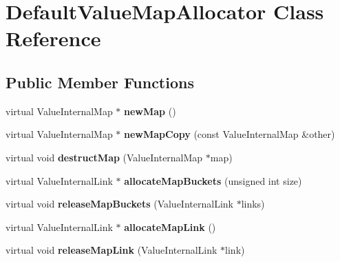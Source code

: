 \hypertarget{class_default_value_map_allocator}{\section{Default\-Value\-Map\-Allocator Class Reference}
\label{class_default_value_map_allocator}
}
\subsection*{Public Member Functions}
\begin{DoxyCompactItemize}
\item 
\hypertarget{class_default_value_map_allocator_af58f1000da938b453f499270642db381}{virtual Value\-Internal\-Map $\ast$ {\bfseries new\-Map} ()}\label{class_default_value_map_allocator_af58f1000da938b453f499270642db381}

\item 
\hypertarget{class_default_value_map_allocator_a4edf94de1fe95c7722421694c3ac101f}{virtual Value\-Internal\-Map $\ast$ {\bfseries new\-Map\-Copy} (const Value\-Internal\-Map \&other)}\label{class_default_value_map_allocator_a4edf94de1fe95c7722421694c3ac101f}

\item 
\hypertarget{class_default_value_map_allocator_aa37cddbdf061065dbe6cb12e9de5ac08}{virtual void {\bfseries destruct\-Map} (Value\-Internal\-Map $\ast$map)}\label{class_default_value_map_allocator_aa37cddbdf061065dbe6cb12e9de5ac08}

\item 
\hypertarget{class_default_value_map_allocator_a1dc9a181273b90fa7098313316c53fcf}{virtual Value\-Internal\-Link $\ast$ {\bfseries allocate\-Map\-Buckets} (unsigned int size)}\label{class_default_value_map_allocator_a1dc9a181273b90fa7098313316c53fcf}

\item 
\hypertarget{class_default_value_map_allocator_a45a33b35da50dc69c47dfd31e49c1b0e}{virtual void {\bfseries release\-Map\-Buckets} (Value\-Internal\-Link $\ast$links)}\label{class_default_value_map_allocator_a45a33b35da50dc69c47dfd31e49c1b0e}

\item 
\hypertarget{class_default_value_map_allocator_acc658ce4f2d738fd4db6222c8f89defd}{virtual Value\-Internal\-Link $\ast$ {\bfseries allocate\-Map\-Link} ()}\label{class_default_value_map_allocator_acc658ce4f2d738fd4db6222c8f89defd}

\item 
\hypertarget{class_default_value_map_allocator_ad6998891b5b25c53d28055eed8e4a355}{virtual void {\bfseries release\-Map\-Link} (Value\-Internal\-Link $\ast$link)}\label{class_default_value_map_allocator_ad6998891b5b25c53d28055eed8e4a355}

\end{DoxyCompactItemize}


